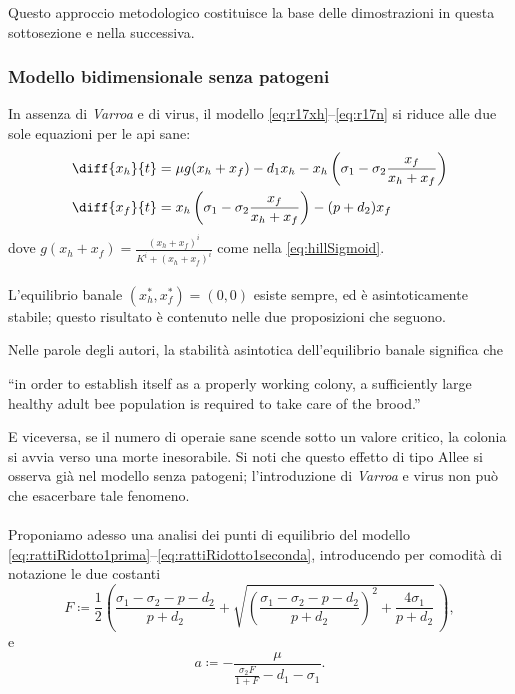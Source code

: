 Questo approccio metodologico costituisce la base delle dimostrazioni in questa sottosezione e nella successiva.


\subsubsection{Modello bidimensionale senza patogeni}
In assenza di \emph{Varroa} e di virus, il modello \eqref{eq:r17xh}--\eqref{eq:r17n} si riduce alle due sole equazioni per le api sane:
\begin{align}
    \diff{x_h}{t} &= \mu g( x_h + x_f ) - d_1 x_h - x_h \left( \sigma_1 - \sigma_2 \frac{x_f}{x_h + x_f} \right)
    \label{eq:rattiRidotto1prima}
    \\
    \diff{x_f}{t} &= x_h \left( \sigma_1 - \sigma_2 \frac{x_f}{x_h + x_f} \right) - (p + d_2) x_f
    \label{eq:rattiRidotto1seconda}
\end{align}
dove $g(x_h + x_f) = \frac{ (x_h+x_f)^i }{ K^i + (x_h+x_f)^i }$ come nella \eqref{eq:hillSigmoid}.

\paragraph{}
L'equilibrio banale $(x_h^*, x_f^*) = (0,0)$ esiste sempre, ed è asintoticamente stabile; questo risultato è contenuto nelle due proposizioni che seguono.

Nelle parole degli autori, la stabilità asintotica dell'equilibrio banale significa che
\begin{displayquote}
``\omissis in order to establish itself as a properly working colony, a sufficiently large healthy adult bee population is required to take care of the brood.''
\end{displayquote}

E viceversa, se il numero di operaie sane scende sotto un valore critico, la colonia si avvia verso una morte inesorabile.
Si noti che questo effetto di tipo Allee si osserva già nel modello senza patogeni; l'introduzione di \emph{Varroa} e virus non può che esacerbare tale fenomeno.

\paragraph{}
Proponiamo adesso una analisi dei punti di equilibrio del modello \eqref{eq:rattiRidotto1prima}--\eqref{eq:rattiRidotto1seconda}, introducendo per comodità di notazione le due costanti
$$
    F \coloneq \frac{1}{2} \left( \frac{ \sigma_1 - \sigma_2 - p - d_2 }{p+d_2} +
    \sqrt{ {\left( \frac{ \sigma_1 - \sigma_2 - p - d_2 }{p+d_2} \right)}^2 + \frac{4 \sigma_1}{p+d_2} } \, \right),
$$
e
$$ a \coloneq - \frac{ \mu }{ \frac{\sigma_2 F}{1+F} - d_1 - \sigma_1 }.$$

